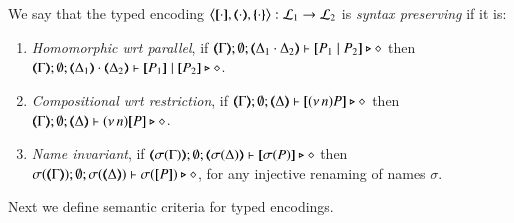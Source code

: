 \smallskip 

\begin{definition}\rm
	\label{def:sep}
	We say that 
	the typed encoding 
	$\enco{\map{\cdot}, \mapt{\cdot}, \mapa{\cdot}}: \tyl{L}_1 \to \tyl{L}_2$ is \emph{syntax preserving}
	if it is:
	
	\begin{enumerate}[1.]
		\item	\emph{Homomorphic wrt parallel},   if 
		$\mapt{\Gamma}; \emptyset; \mapt{\Delta_1 \cat \Delta_2} \proves \map{P_1 \Par P_2} \hastype \Proc$
		then 
		$\mapt{\Gamma}; \emptyset; \mapt{\Delta_1} \cat \mapt{\Delta_2} \proves \map{P_1} \Par \map{P_2} \hastype \Proc$.

		\item	\emph{Compositional wrt restriction},  if 
		$\mapt{\Gamma}; \emptyset; \mapt{\Delta} \proves \map{\news{n}P} \hastype \Proc$
		then 
		$\mapt{\Gamma}; \emptyset; \mapt{\Delta} \proves \news{n}\map{P} \hastype \Proc$.
		
		\item \emph{Name invariant},   if
		$\mapt{\sigma(\Gamma)}; \emptyset; \mapt{\sigma(\Delta)} \proves \map{\sigma(P)} \hastype \Proc$
		then 
		$\sigma(\mapt{\Gamma}); \emptyset; \sigma(\mapt{\Delta}) \proves \sigma(\map{P}) \hastype \Proc$, 
		for any injective renaming  of names $\sigma$.
	\end{enumerate}
\end{definition}

\smallskip 
Next we define semantic criteria for typed encodings.

